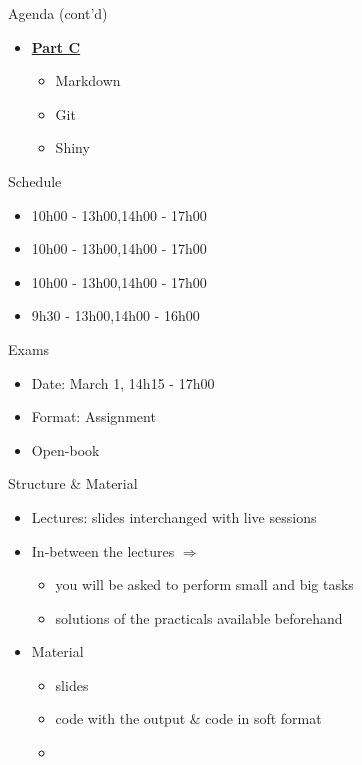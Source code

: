 \documentclass[14pt, aspectratio=169, sectionpage=simple, xclolor=table]{beamer}
\begin{document}
\begin{frame}{Agenda (cont'd)}
\begin{itemize}
\item {\Large \underline{\textbf{Part C}} }
\vspace{1ex}
\vspace{1ex}
\begin{itemize}
	\item Markdown
	\item Git
	\item Shiny
\end{itemize}
\end{itemize}
\end{frame}
\begin{frame}{Schedule}
\begin{itemize}
	\item {} 10h00 - 13h00,\quad 14h00 - 17h00
	\item {} 10h00 - 13h00,\quad 14h00 - 17h00
 	\item {} 10h00 - 13h00,\quad 14h00 - 17h00
	\item {} \phantom{1}9h30 - 13h00,\quad 14h00 - 16h00
\end{itemize}
\end{frame}
\begin{frame}{Exams}
\begin{itemize}
	\item Date: March 1, 14h15 - 17h00
	\nl
	\item Format: Assignment
	\nl
	\item Open-book
\end{itemize}
\end{frame}
\begin{frame}[fragile]{Structure \& Material}
\begin{itemize}
	\item Lectures: slides interchanged with live \R sessions
	\nl
	\item In-between the lectures $\Rightarrow$ 
	\begin{itemize}
		\item you will be asked to perform small and big tasks
		\item solutions of the practicals available beforehand
		\nl
	\end{itemize}
	\item Material
	\begin{itemize}
		\item slides
		\item \R code with the output \& \R code in soft format
		\item {}
	\end{itemize}
\end{itemize}
\end{frame}
\end{document}

